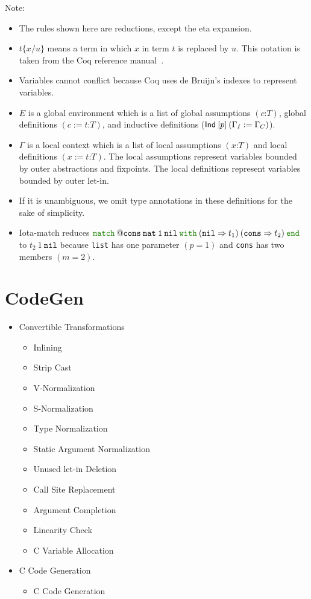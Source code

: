 \documentclass[a4paper,fleqn]{article}
\def\coq{\textrm{Coq}}
\newcommand{\kwmatch}{\mbox{\color{mygreen}\ttfamily match}}
\newcommand{\kwwith}{\mbox{\color{mygreen}\ttfamily with}}
\newcommand{\kwend}{\mbox{\color{mygreen}\ttfamily end}}
\newcommand{\gassum}[2]{(#1\mathord{:}#2)}
\newcommand{\glodef}[3]{(#1:=#2\mathord{:}#3)}
\newcommand{\lassum}[2]{(#1\mathord{:}#2)}
\newcommand{\ldef}[3]{(#1:=#2\mathord{:}#3)}
\newcommand{\subst}[3]{#1\{#2/#3\}}
\begin{document}
{\small Note:
\begin{itemize}
  \item The rules shown here are reductions, except the eta expansion.
  \item $\subst{t}{x}{u}$ means a term in which $x$ in term $t$ is replaced by $u$.
    This notation is taken from the Coq reference manual~\cite{coqrefman8.12.0}.
  \item Variables cannot conflict because \coq{} uses de Bruijn's indexes to represent variables.
  \item $E$ is a global environment which is a list of
    global assumptions $\gassum{c}{T}$,
    global definitions $\glodef{c}{t}{T}$, and
    inductive definitions ($\text{\sf Ind}\:[p]\:(\Gamma_I := \Gamma_C)$).
  \item $\Gamma$ is a local context which is a list of
    local assumptions $\lassum{x}{T}$ and
    local definitions $\ldef{x}{t}{T}$.
    The local assumptions represent variables bounded by outer abstractions and fixpoints.
    The local definitions represent variables bounded by outer let-in.
  \item If it is unambiguous, we omit type annotations in these definitions for the sake of simplicity.
  \item Iota-match reduces $\kwmatch\:\mathtt{@cons\:nat\:1\:nil}\:\kwwith\:(\mathtt{nil} \Rightarrow t_1)\:(\mathtt{cons} \Rightarrow t_2)\:\kwend$ to $t_2\:1\:\mathtt{nil}$
    because \lstinline!list! has one parameter $(p=1)$ and \lstinline!cons! has two members $(m=2)$.
\end{itemize}}

\section{CodeGen}\label{sec:codegen}

\begin{itemize}
\item Convertible Transformations
  \begin{itemize}
  \item Inlining
  \item Strip Cast
  \item V-Normalization
  \item S-Normalization
  \item Type Normalization
  \item Static Argument Normalization
  \item Unused let-in Deletion
  \item Call Site Replacement
  \item Argument Completion
  \item Linearity Check
  \item C Variable Allocation
  \end{itemize}
\item C Code Generation
  \begin{itemize}
  \item C Code Generation
  \end{itemize}
\end{itemize}
\end{document}
